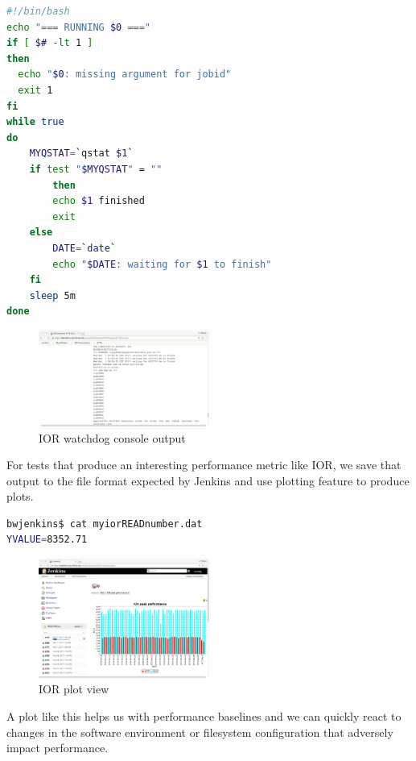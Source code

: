 \documentclass[10pt, conference, compsocconf]{IEEEtran}
\begin{document}
\begin{lstlisting}[frame=tb,captionpos=t,language=bash,caption={pbs/torque watchdog script}, label=lst:watchdog]
#!/bin/bash
echo "=== RUNNING $0 ==="
if [ $# -lt 1 ]
then
  echo "$0: missing argument for jobid"
  exit 1
fi
while true
do
	MYQSTAT=`qstat $1`
	if test "$MYQSTAT" = ""
        then
		echo $1 finished
		exit
	else
		DATE=`date`
		echo "$DATE: waiting for $1 to finish"
	fi
	sleep 5m
done
\end{lstlisting}

\begin{figure}[H]
\centering
\includegraphics[width=0.5\textwidth]{IOR-watchdog-out}
\caption{ IOR watchdog console output }
\label{fig:IOR-watchdog-out}
\end{figure}
For tests that produce an interesting performance metric like IOR, we save that output to the file format expected by Jenkins and use plotting feature to produce plots. 
\begin{lstlisting}[frame=tb,captionpos=t,language=bash,caption={sample YVALUE output file}, label=lst:yvalue]
bwjenkins$ cat myiorREADnumber.dat 
YVALUE=8352.71
\end{lstlisting}
\begin{figure}[H]
\centering
\includegraphics[width=0.5\textwidth]{IOR-plot}
\caption{ IOR plot view }
\label{fig:IOR-plot}
\end{figure}
A plot like this helps us with performance baselines and we can quickly react to changes in the software environment or filesystem configuration that adversely impact performance.
\end{document}
